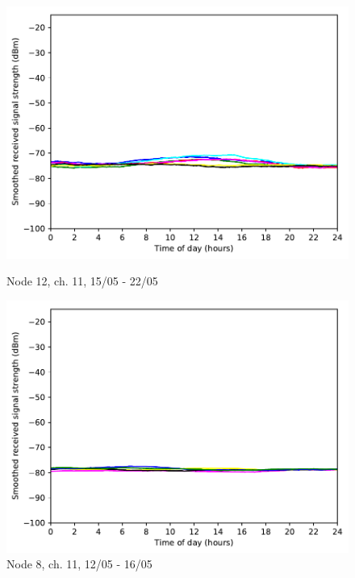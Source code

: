 \documentclass[a4paper, 11pt]{article}
\begin{document}
\begin{figure}[!h]
\begin{minipage}{0.47\textwidth}
    \centering
	\includegraphics[width=\textwidth]{images/2_4_GHz/cot-node12-student_2017-05-22_chan11_image}
    \caption{Node 12, ch. 11, 15/05 - 22/05} \label{node12-11}
\end{minipage}\hfill
\begin{minipage}{0.47\textwidth}
    \centering
	\includegraphics[width=\textwidth]{images/2_4_GHz/cot-node8-student_2017-05-16_chan11_image}
    \caption{Node 8, ch. 11, 12/05 - 16/05} \label{node8-11}
\end{minipage}\hfill
\end{figure}
\end{document}
